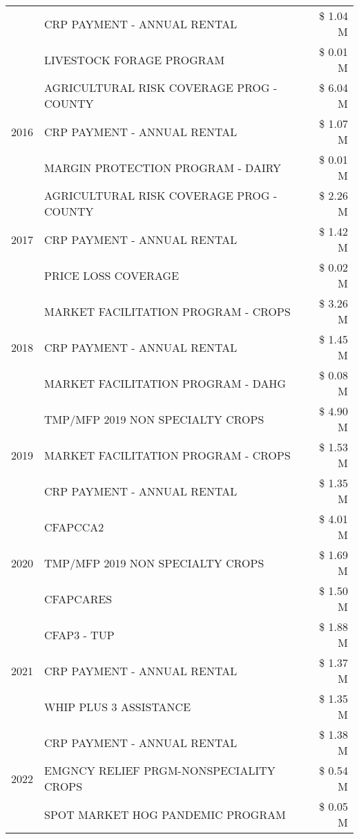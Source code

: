 \begin{tabular}{llr}
 & CRP PAYMENT - ANNUAL RENTAL & \$ 1.04 M \\
 & LIVESTOCK FORAGE PROGRAM & \$ 0.01 M \\
\cline{1-3}
\multirow[t]{3}{*}{2016} & AGRICULTURAL RISK COVERAGE PROG - COUNTY & \$ 6.04 M \\
 & CRP PAYMENT - ANNUAL RENTAL & \$ 1.07 M \\
 & MARGIN PROTECTION PROGRAM - DAIRY & \$ 0.01 M \\
\cline{1-3}
\multirow[t]{3}{*}{2017} & AGRICULTURAL RISK COVERAGE PROG - COUNTY & \$ 2.26 M \\
 & CRP PAYMENT - ANNUAL RENTAL & \$ 1.42 M \\
 & PRICE LOSS COVERAGE & \$ 0.02 M \\
\cline{1-3}
\multirow[t]{3}{*}{2018} & MARKET FACILITATION PROGRAM - CROPS & \$ 3.26 M \\
 & CRP PAYMENT - ANNUAL RENTAL & \$ 1.45 M \\
 & MARKET FACILITATION PROGRAM - DAHG & \$ 0.08 M \\
\cline{1-3}
\multirow[t]{3}{*}{2019} & TMP/MFP 2019 NON SPECIALTY CROPS & \$ 4.90 M \\
 & MARKET FACILITATION PROGRAM - CROPS & \$ 1.53 M \\
 & CRP PAYMENT - ANNUAL RENTAL & \$ 1.35 M \\
\cline{1-3}
\multirow[t]{3}{*}{2020} & CFAPCCA2 & \$ 4.01 M \\
 & TMP/MFP 2019 NON SPECIALTY CROPS & \$ 1.69 M \\
 & CFAPCARES & \$ 1.50 M \\
\cline{1-3}
\multirow[t]{3}{*}{2021} & CFAP3 - TUP & \$ 1.88 M \\
 & CRP PAYMENT - ANNUAL RENTAL & \$ 1.37 M \\
 & WHIP PLUS 3 ASSISTANCE & \$ 1.35 M \\
\cline{1-3}
\multirow[t]{3}{*}{2022} & CRP PAYMENT - ANNUAL RENTAL & \$ 1.38 M \\
 & EMGNCY RELIEF PRGM-NONSPECIALITY CROPS & \$ 0.54 M \\
 & SPOT MARKET HOG PANDEMIC PROGRAM & \$ 0.05 M \\
\cline{1-3}
\bottomrule
\end{tabular}
